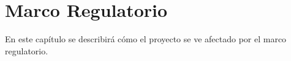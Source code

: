 \chapter{Marco Regulatorio}\label{chap:marco-regulador}

En este capítulo se describirá cómo el proyecto se ve afectado por el marco regulatorio.